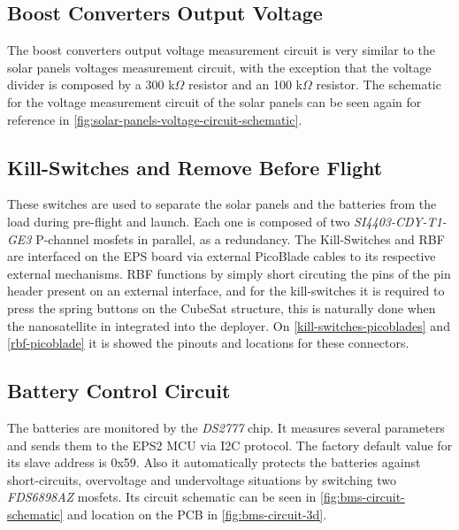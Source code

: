 \subsection{Boost Converters Output Voltage}

The boost converters output voltage measurement circuit is very similar to the solar panels voltages measurement circuit, with the exception that the voltage divider is composed by a 300 k$\Omega$ resistor and an 100 k$\Omega$ resistor.
The schematic for the voltage measurement circuit of the solar panels can be seen again for reference in \autoref{fig:solar-panels-voltage-circuit-schematic}.

\subsection{Kill-Switches and Remove Before Flight}

These switches are used to separate the solar panels and the batteries from the load during pre-flight and launch. Each one is composed of two \textit{SI4403-CDY-T1-GE3} P-channel mosfets in parallel, as a redundancy.
The Kill-Switches and RBF are interfaced on the EPS board via external PicoBlade cables to its respective external mechanisms. RBF functions by simply short circuting the pins of the pin header present on an external interface\cite{iip}, and for the kill-switches it is required to press the spring buttons on the CubeSat structure, this is naturally done when the nanosatellite in integrated into the deployer.
On \autoref{kill-switches-picoblades} and \autoref{rbf-picoblade} it is showed the pinouts and locations for these connectors.

\subsection{Battery Control Circuit}

The batteries are monitored by the \textit{DS2777} chip. It measures several parameters and sends them to the EPS2 MCU via I2C protocol. The factory default value for its slave address is 0x59. Also it automatically protects the batteries against short-circuits, overvoltage and undervoltage situations by switching two \textit{FDS6898AZ} mosfets.
Its circuit schematic can be seen in \autoref{fig:bms-circuit-schematic} and location on the PCB in \autoref{fig:bms-circuit-3d}.

